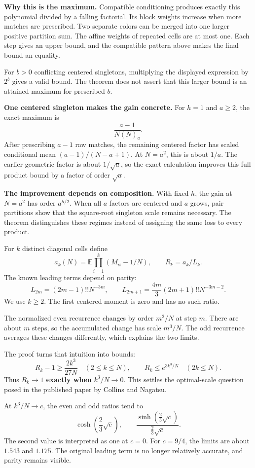 \documentclass[11pt]{article}
\newcommand{\E}{\mathbb E}
\newcommand{\pagetitle}[2]{\noindent{\small\sffamily\color{teal}#1}\par\vspace{5pt}\noindent{\LARGE\bfseries\color{ink}#2}\par\vspace{12pt}}
\begin{document}
\textbf{Why this is the maximum.} Compatible conditioning produces exactly this polynomial divided by a falling factorial. Its block weights increase when more matches are prescribed. Two separate colors can be merged into one larger positive partition sum. The affine weights of repeated cells are at most one. Each step gives an upper bound, and the compatible pattern above makes the final bound an equality.

For $b>0$ conflicting centered singletons, multiplying the displayed expression by $2^b$ gives a valid bound. The theorem does not assert that this larger bound is an attained maximum for prescribed $b$.

\textbf{One centered singleton makes the gain concrete.} For $h=1$ and $a\ge2$, the exact maximum is
\[
\frac{a-1}{N(N)_a}.
\]
After prescribing $a-1$ raw matches, the remaining centered factor has scaled conditional mean $(a-1)/(N-a+1)$. At $N=a^2$, this is about $1/a$. The earlier geometric factor is about $1/\sqrt a$, so the exact calculation improves this full product bound by a factor of order $\sqrt a$.

\textbf{The improvement depends on composition.} With fixed $h$, the gain at $N=a^2$ has order $a^{h/2}$. When all $a$ factors are centered and $a$ grows, pair partitions show that the square-root singleton scale remains necessary. The theorem distinguishes these regimes instead of assigning the same loss to every product.

\newpage
\pagetitle{THE FIRST TRANSITION}{Why the order enters as a cube}

For $k$ distinct diagonal cells define
\[
a_k(N)=\E\prod_{i=1}^k(M_{ii}-1/N),\qquad R_k=a_k/L_k.
\]
The known leading terms depend on parity:
\[
L_{2m}=(2m-1)!!N^{-3m},\qquad
L_{2m+1}=\frac{4m}{3}(2m+1)!!N^{-3m-2}.
\]
We use $k\ge2$. The first centered moment is zero and has no such ratio.

The normalized even recurrence changes by order $m^2/N$ at step $m$. There are about $m$ steps, so the accumulated change has scale $m^3/N$. The odd recurrence averages these changes differently, which explains the two limits.

The proof turns that intuition into bounds:
\[
R_k-1\ge\frac{2k^3}{27N}\quad(2\le k\le N),\qquad
R_k\le e^{3k^3/N}\quad(2k\le N).
\]
Thus $R_k\to1$ \textbf{exactly when} $k^3/N\to0$. This settles the optimal-scale question posed in the published paper by Collins and Nagatsu.

At $k^3/N\to c$, the even and odd ratios tend to
\[
\cosh\left(\frac23\sqrt c\right),\qquad
\frac{\sinh(\frac23\sqrt c)}{\frac23\sqrt c}.
\]
The second value is interpreted as one at $c=0$. For $c=9/4$, the limits are about $1.543$ and $1.175$. The original leading term is no longer relatively accurate, and parity remains visible.
\end{document}
